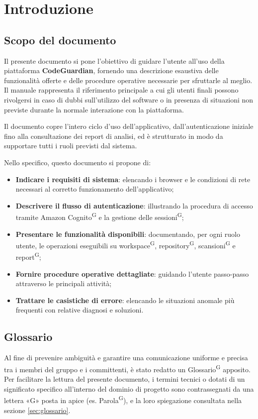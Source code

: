 \documentclass[a4paper, 11pt]{article}
\begin{document}
\section{Introduzione}

\subsection{Scopo del documento}
Il presente documento si pone l'obiettivo di guidare l'utente all'uso della piattaforma \textbf{CodeGuardian}, fornendo una descrizione esaustiva delle funzionalità offerte e delle procedure operative necessarie per sfruttarle al meglio. Il manuale rappresenta il riferimento principale a cui gli utenti finali possono rivolgersi in caso di dubbi sull'utilizzo del software o in presenza di situazioni non previste durante la normale interazione con la piattaforma.

Il documento copre l'intero ciclo d'uso dell'applicativo, dall'autenticazione iniziale fino alla consultazione dei report di analisi, ed è strutturato in modo da supportare tutti i ruoli previsti dal sistema.

Nello specifico, questo documento si propone di:
\begin{itemize}
  \item \textbf{Indicare i requisiti di sistema}: elencando i browser e le condizioni di rete necessari al corretto funzionamento dell'applicativo;
  \item \textbf{Descrivere il flusso di autenticazione}: illustrando la procedura di accesso tramite Amazon Cognito\textsuperscript{G} e la gestione delle sessioni\textsuperscript{G};
  \item \textbf{Presentare le funzionalità disponibili}: documentando, per ogni ruolo utente, le operazioni eseguibili su workspace\textsuperscript{G}, repository\textsuperscript{G}, scansioni\textsuperscript{G} e report\textsuperscript{G};
  \item \textbf{Fornire procedure operative dettagliate}: guidando l'utente passo-passo attraverso le principali attività;
  \item \textbf{Trattare le casistiche di errore}: elencando le situazioni anomale più frequenti con relative diagnosi e soluzioni.
\end{itemize}

\subsection{Glossario}
Al fine di prevenire ambiguità e garantire una comunicazione uniforme e precisa tra i membri del gruppo e i committenti, è stato redatto un Glossario\textsuperscript{G} apposito.
Per facilitare la lettura del presente documento, i termini tecnici o dotati di un significato specifico all'interno del dominio di progetto sono contrassegnati da una lettera «G» posta in apice (es. Parola\textsuperscript{G}), e la loro spiegazione consultata nella sezione \ref{sec:glossario}.
\end{document}
